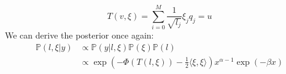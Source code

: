 \documentclass{siamart1116}
\begin{document}
    \begin{equation}
    \label{eqn:gamma_T}
    T(v, \xi) = \sum_{i=0}^M \frac{1}{\sqrt{l_j}}\xi_jq_j = u
    \end{equation}
    We can derive the posterior once again:
    \begin{align*}
    \mathbb{P}(l,\xi | y) &\propto \mathbb{P}(y|l,\xi)\mathbb{P}(\xi)\mathbb{P}(l)\\
    &\propto \exp\left(-\Phi(T(l,\xi)) -\frac{1}{2}\langle\xi, \xi \rangle\right)x^{\alpha - 1}\exp(-\beta x)
    \end{align*}


\end{document}
